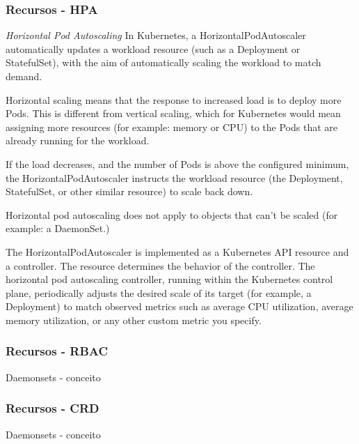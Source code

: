 \begin{frame}
\frametitle{Recursos - HPA}
	\textit{Horizontal Pod Autoscaling}
	In Kubernetes, a HorizontalPodAutoscaler automatically updates a workload resource (such as a Deployment or StatefulSet), with the aim of automatically scaling the workload to match demand.

Horizontal scaling means that the response to increased load is to deploy more Pods. This is different from vertical scaling, which for Kubernetes would mean assigning more resources (for example: memory or CPU) to the Pods that are already running for the workload.

If the load decreases, and the number of Pods is above the configured minimum, the HorizontalPodAutoscaler instructs the workload resource (the Deployment, StatefulSet, or other similar resource) to scale back down.

Horizontal pod autoscaling does not apply to objects that can't be scaled (for example: a DaemonSet.)

The HorizontalPodAutoscaler is implemented as a Kubernetes API resource and a controller. The resource determines the behavior of the controller. The horizontal pod autoscaling controller, running within the Kubernetes control plane, periodically adjusts the desired scale of its target (for example, a Deployment) to match observed metrics such as average CPU utilization, average memory utilization, or any other custom metric you specify.
\end{frame}

\begin{frame}
\frametitle{Recursos - RBAC}
    Daemonsets - conceito
\end{frame}

\begin{frame}
\frametitle{Recursos - CRD}
    Daemonsets - conceito
\end{frame}
